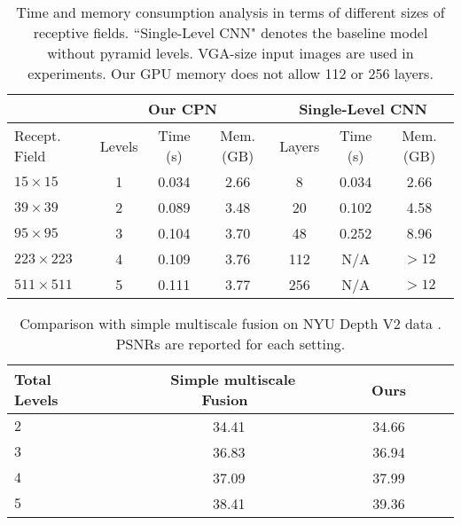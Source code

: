 \documentclass[10pt,twocolumn,letterpaper]{article}
\begin{document}
\begin{table}[t]
\centering \setlength{\tabcolsep}{.07cm} \footnotesize
\begin{tabular}{|l|c|c|c|c|c|c|}
  \hline
  & \multicolumn{3}{c|}{Our CPN} & \multicolumn{3}{c|}{Single-Level CNN} \\
  \hline
  Recept. Field & Levels & Time (s) & Mem. (GB) & Layers & Time (s) & Mem. (GB) \\
  \hline
  \hline
   $15 \times 15$ & 1 & 0.034 & 2.66 & 8 & 0.034 & 2.66\\
  \hline
  $39 \times 39$ & 2 & 0.089 & 3.48 & 20 & 0.102 & 4.58\\
  \hline
  $95 \times 95$ & 3 & 0.104 & 3.70 & 48 & 0.252 & 8.96\\
  \hline
  $223 \times 223$ & 4 & 0.109 & 3.76 & 112 & N/A & $>12$\\
  \hline
  $511 \times 511$ & 5 & 0.111 & 3.77 & 256 & N/A &  $>12$\\
  \hline
\end{tabular}\vspace{0.1in}
\caption{Time and memory consumption analysis in terms of different sizes of receptive
fields. ``Single-Level CNN" denotes the baseline model without pyramid levels. VGA-size
input images are used in experiments. Our GPU memory does not allow 112 or 256 layers.
}\label{tab:timeSpace}
\end{table}

\begin{table}[t]
\centering \small
\begin{tabular}{|l|c|c|}
  \hline
  Total Levels~~~~& ~Simple multiscale Fusion~ & ~~~~~Ours~~~~~ \\
  \hline
  \hline
  $2$ & 34.41 & 34.66\\
  \hline
  $3$ & 36.83 & 36.94\\
  \hline
  $4$ & 37.09 & 37.99\\
  \hline
  $5$ & 38.41 & 39.36\\
  \hline
\end{tabular}\vspace{0.1in}
\caption{Comparison with simple multiscale fusion on NYU Depth V2 data
\cite{SilbermanHKF12}. PSNRs are reported for each setting. }\label{tab:multiscale}
\end{table}
\end{document}
